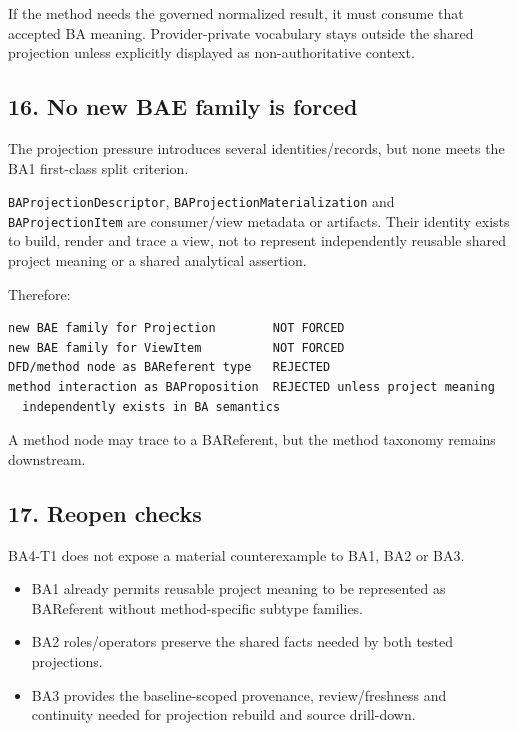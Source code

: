\documentclass[11pt,a4paper]{article}
\providecommand{\tightlist}{\setlength{\itemsep}{0pt}\setlength{\parskip}{0pt}}
\begin{document}
If the method needs the governed normalized result, it must consume that accepted BA meaning. Provider-private vocabulary stays outside the shared projection unless explicitly displayed as non-authoritative context.

\subsection{16. No new BAE family is forced}\label{16-no-new-bae-family-is-forced}

The projection pressure introduces several identities/records, but none meets the BA1 first-class split criterion.

\texttt{BAProjectionDescriptor}, \texttt{BAProjectionMaterialization} and \texttt{BAProjectionItem} are consumer/view metadata or artifacts. Their identity exists to build, render and trace a view, not to represent independently reusable shared project meaning or a shared analytical assertion.

Therefore:

\begin{verbatim}
new BAE family for Projection        NOT FORCED
new BAE family for ViewItem          NOT FORCED
DFD/method node as BAReferent type   REJECTED
method interaction as BAProposition  REJECTED unless project meaning
  independently exists in BA semantics
\end{verbatim}

A method node may trace to a BAReferent, but the method taxonomy remains downstream.

\subsection{17. Reopen checks}\label{17-reopen-checks}

BA4-T1 does not expose a material counterexample to BA1, BA2 or BA3.

\begin{itemize}
\tightlist
\item
  BA1 already permits reusable project meaning to be represented as BAReferent without method-specific subtype families.
\item
  BA2 roles/operators preserve the shared facts needed by both tested projections.
\item
  BA3 provides the baseline-scoped provenance, review/freshness and continuity needed for projection rebuild and source drill-down.
\end{itemize}
\end{document}
